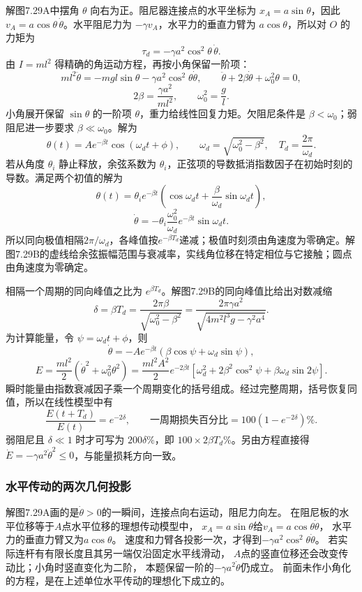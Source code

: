 \documentclass[UTF8,fontset=fandol,a4paper,11pt]{ctexart}
\begin{document}
解图7.29A中摆角 $\theta$ 向右为正。阻尼器连接点的水平坐标为 $x_A=a\sin\theta$，因此 $v_A=a\cos\theta\,\dot\theta$。水平阻尼力为 $-\gamma v_A$，水平力的垂直力臂为 $a\cos\theta$，所以对 $O$ 的力矩为
\[\tau_d=-\gamma a^2\cos^2\theta\,\dot\theta.\]
由 $I=ml^2$ 得精确的角运动方程，再按小角保留一阶项：
\[ml^2\ddot\theta=-mgl\sin\theta-\gamma a^2\cos^2\theta\dot\theta,
\qquad \ddot\theta+2\beta\dot\theta+\omega_0^2\theta=0,\]
\[2\beta=\frac{\gamma a^2}{ml^2},\qquad\omega_0^2=\frac gl.
\]
小角展开保留 $\sin\theta$ 的一阶项 $\theta$，重力给线性回复力矩。欠阻尼条件是 $\beta<\omega_0$；弱阻尼进一步要求 $\beta\ll\omega_0$。解为
\[\theta(t)=A e^{-\beta t}\cos(\omega_d t+\phi),\qquad
\omega_d=\sqrt{\omega_0^2-\beta^2},\quad T_d=\frac{2\pi}{\omega_d}.\]
若从角度 $\theta_i$ 静止释放，余弦系数为 $\theta_i$，正弦项的导数抵消指数因子在初始时刻的导数。满足两个初值的解为
\[\theta(t)=\theta_i e^{-\beta t}
\left(\cos\omega_dt+\frac\beta{\omega_d}\sin\omega_dt\right),\]
\[\dot\theta=-\theta_i\frac{\omega_0^2}{\omega_d}e^{-\beta t}\sin\omega_dt.\]
所以同向极值相隔$2\pi/\omega_d$，各峰值按$e^{-\beta T_d}$递减；极值时刻须由角速度为零确定。解图7.29B的虚线给余弦振幅范围与衰减率，实线角位移在特定相位与它接触；圆点由角速度为零确定。

相隔一个周期的同向峰值之比为 $e^{\beta T_d}$。解图7.29B的同向峰值比给出对数减缩
\[\boxed{\delta=\beta T_d=\frac{2\pi\beta}{\sqrt{\omega_0^2-\beta^2}}
=\frac{2\pi\gamma a^2}{\sqrt{4m^2l^3g-\gamma^2a^4}}.}\]
为计算能量，令 $\psi=\omega_dt+\phi$，则
\[\dot\theta=-Ae^{-\beta t}(\beta\cos\psi+\omega_d\sin\psi),\]
\[E=\frac{ml^2}{2}(\dot\theta^2+\omega_0^2\theta^2)
=\frac{ml^2A^2}{2}e^{-2\beta t}
[\omega_d^2+2\beta^2\cos^2\psi+\beta\omega_d\sin2\psi].\]
瞬时能量由指数衰减因子乘一个周期变化的括号组成。经过完整周期，括号恢复同值，所以在线性模型中有
\[\frac{E(t+T_d)}{E(t)}=e^{-2\delta},\qquad
\boxed{\text{一周期损失百分比}=100(1-e^{-2\delta})\%.}\]
弱阻尼且 $\delta\ll1$ 时才可写为 $200\delta\%$，即 $100\times 2\beta T_d\%$。另由方程直接得 $\dot E=-\gamma a^2\dot\theta^2\le0$，与能量损耗方向一致。
\subsubsection*{水平传动的两次几何投影}
解图7.29A画的是$\dot\theta>0$的一瞬间，连接点向右运动，阻尼力向左。
在阻尼板的水平位移等于$A$点水平位移的理想传动模型中，
$x_A=a\sin\theta$给$v_A=a\cos\theta\dot\theta$，
水平力的垂直力臂又为$a\cos\theta$。
速度和力臂各投影一次，才得到$-\gamma a^2\cos^2\theta\dot\theta$。
若实际连杆有有限长度且其另一端仅沿固定水平线滑动，
$A$点的竖直位移还会改变传动比；小角时竖直变化为二阶，
本题保留一阶的$-\gamma a^2\dot\theta$仍成立。
前面未作小角化的方程，是在上述单位水平传动的理想化下成立的。
\end{document}
